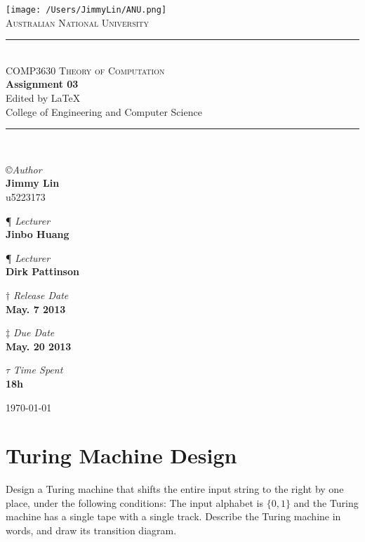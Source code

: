 \documentclass[11pt,a4paper]{article}
\newcommand{\AUTHOR}{Jimmy Lin}
\newcommand{\UID}{u5223173}
\newcommand{\UNIVERSITY}{Australian National University}
\newcommand{\COLLEGE}{College of Engineering and Computer Science}
\newcommand{\COURSE}{COMP3630 Theory of Computation}
\newcommand{\LECTURER}{Jinbo Huang}
\newcommand{\LECTURERt}{Dirk Pattinson}
\newcommand{\TASK}{Assignment 03}
\newcommand{\RELEASEDATE}{May. 7 2013}
\newcommand{\DUEDATE}{May. 20 2013}
\newcommand{\TIMECONSUME}{18h}
\begin{document}
\begin{titlepage}
    \begin{center}
        \vspace*{0.8cm}
\texttt{[image: /Users/JimmyLin/ANU.png]}\\[1cm]
\textsc{\LARGE \UNIVERSITY}\\[1.5cm]

\rule{\linewidth}{0.5mm} \\[0.4cm]
{ \textsc{\Large \COURSE}\\[0.5cm]
 \huge \bfseries \TASK}\\[0.4cm]
 \footnotesize Edited by \LaTeX \\[0.25cm]
 \normalsize{\COLLEGE}
\rule{\linewidth}{0.5mm} \\[1.5cm]

\begin{center}
\copyright \emph{\large Author} \\
\Large \textbf{\AUTHOR} \\ \UID \vspace*{0.6cm}

\P \emph{ Lecturer} \\
\Large \textbf{\LECTURER} \vspace*{0.6cm}

\P \emph{ Lecturer} \\
\Large \textbf{\LECTURERt} \vspace*{0.6cm}


$\dagger$ \emph{Release Date}  \\
\Large \textbf{\RELEASEDATE} \vspace*{0.6cm} 

$\ddagger$ \emph{Due Date}  \\
\Large \textbf{\DUEDATE} \vspace*{0.6cm}

$\tau$ \emph{Time Spent} \\
\Large \textbf{\TIMECONSUME} \vspace*{0.6cm} 
\end{center}
\vfill
{\large \today}
\end{center}
\end{titlepage}

\begin{center} \tableofcontents \end{center}
 \newpage
\section{Turing Machine Design}
Design a Turing machine that shifts the entire input string to the right by one place, under the following conditions: The input alphabet is $\{0, 1\}$ and the Turing machine has a single tape with a single track. Describe the Turing machine in words, and draw its transition diagram.
\end{document}
